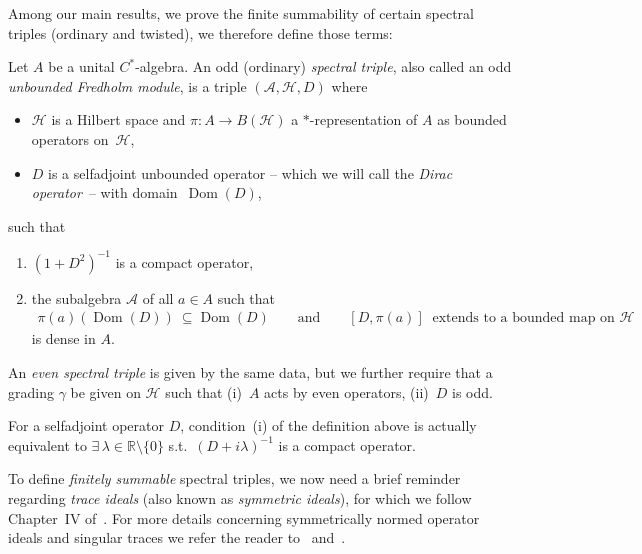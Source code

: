 \documentclass[pdftex]{sigma}
\newcommand{\Aa}{\mathcal{A}}
\newcommand{\Hh}{\mathscr{H}}
\newcommand{\R}{\mathbb{R}}
\DeclareMathOperator{\dom}{Dom}
\numberwithin{equation}{section}
\begin{document}
Among our main results, we prove the f\/inite summability of certain spectral triples (ordinary and twisted), we therefore def\/ine those terms:
\begin{Definition}
\label{Def:TrSp}
Let $A$ be a unital $C^*$-algebra. An odd (ordinary) \emph{spectral triple}, also called an odd \emph{unbounded Fredholm module}, is a triple $(\Aa, \Hh, D)$ where
\begin{itemize}\itemsep=0pt
\item
$\Hh$ is a Hilbert space and $\pi \colon A\to B(\Hh)$ a $*$-representation of $A$ as bounded operators on~$\Hh$,
\item
$D$ is a selfadjoint unbounded operator -- which we will call the \emph{Dirac operator}~-- with domain~$\dom(D)$,
\end{itemize}
such that
\begin{enumerate}\itemsep=0pt
\item[(i)]
$(1+D^2)^{-1}$ is a compact operator,
\item[(ii)]
the subalgebra $\Aa$ of all $a\in A$ such that
\begin{gather*}
\pi(a) (\dom(D)) \ \subseteq \dom(D)
\qquad
 \text{and}
\qquad
[D,\pi(a)] \ \text{ extends to a bounded map on }\Hh
\end{gather*}
is dense in $A$.
\end{enumerate}
An \emph{even spectral triple} is given by the same data, but we further require that a grading $\gamma$ be given on $\Hh$ such that (i)~$A$ acts by even operators, (ii)~$D$ is odd.
\end{Definition}

\begin{Remark}
\label{Rk:SymmIdeals}
For a selfadjoint operator $D$, condition~(i) %
of the def\/inition above is actually equivalent to $\exists\, \lambda \in \R {\setminus} \{ 0 \}$ s.t.\ $(D+i \lambda)^{-1}$ is a compact operator.
\end{Remark}

To def\/ine \emph{finitely summable} spectral triples, we now need a brief reminder regarding \emph{trace ideals} (also known as \emph{symmetric ideals}), for which we follow Chapter~IV of~\cite{NCG}.
For more details concerning symmetrically normed operator ideals and singular traces we refer the reader to~\cite{TraceIdealsSimon} and~\cite{SingularTracesLSZ}.
\end{document}
